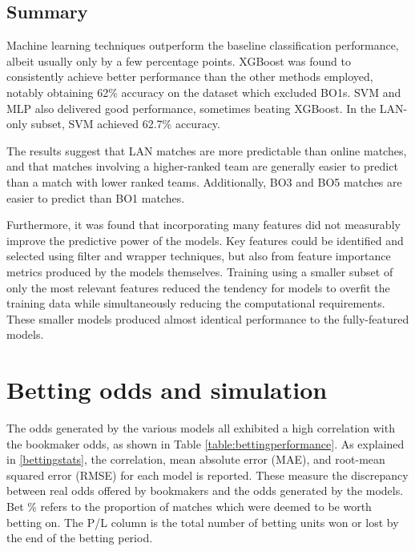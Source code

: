 \subsection{Summary}

Machine learning techniques outperform the baseline classification performance, albeit usually only by a few percentage points. XGBoost was found to consistently achieve better performance than the other methods employed, notably obtaining 62\% accuracy on the dataset which excluded BO1s. SVM and MLP also delivered good performance, sometimes beating XGBoost. In the LAN-only subset, SVM achieved 62.7\% accuracy.

The results suggest that LAN matches are more predictable than online matches, and that matches involving a higher-ranked team are generally easier to predict than a match with lower ranked teams. Additionally, BO3 and BO5 matches are easier to predict than BO1 matches.

Furthermore, it was found that incorporating many features did not measurably improve the predictive power of the models. Key features could be identified and selected using filter and wrapper techniques, but also from feature importance metrics produced by the models themselves. Training using a smaller subset of only the most relevant features reduced the tendency for models to overfit the training data while simultaneously reducing the computational requirements. These smaller models produced almost identical performance to the fully-featured models. 

\clearpage

\section{Betting odds and simulation}

The odds generated by the various models all exhibited a high correlation with the bookmaker odds, as shown in Table \ref{table:bettingperformance}. As explained in \ref{bettingstats}, the correlation, mean absolute error (MAE), and root-mean squared error (RMSE) for each model is reported. These measure the discrepancy between real odds offered by bookmakers and the odds generated by the models. Bet \% refers to the proportion of matches which were deemed to be worth betting on. The P/L column is the total number of betting units won or lost by the end of the betting period.

